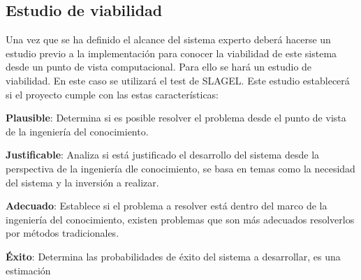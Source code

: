 

\subsection{Estudio de viabilidad}

Una vez que se ha definido el alcance del sistema experto deberá hacerse un estudio
 previo a la implementación para conocer la viabilidad de este sistema desde un punto
 de vista computacional. Para ello se hará un estudio de viabilidad. En este caso se
 utilizará el test de SLAGEL. Este estudio establecerá si el proyecto cumple con las
 estas características:


\begin{compactitem}
  \item \textbf{Plausible}: Determina si es posible resolver el problema desde el
     punto de vista de la ingeniería del conocimiento.
  \item \textbf{Justificable}: Analiza si está justificado el desarrollo del
     sistema desde la perspectiva de la ingeniería dle conocimiento, se basa en
     temas como la necesidad del sistema y la inversión a realizar.
  \item \textbf{Adecuado}: Establece si el problema a resolver está dentro
     del marco de la ingeniería del conocimiento, existen problemas que son más
     adecuados resolverlos por métodos tradicionales.
  \item \textbf{Éxito}: Determina las probabilidades de éxito del sistema a
     desarrollar, es una estimación
\end{compactitem}

